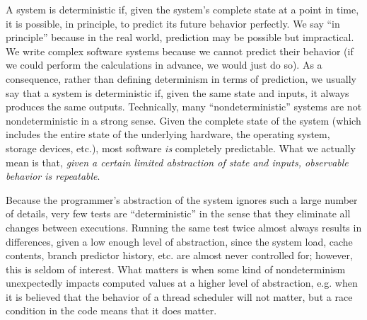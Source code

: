A system is deterministic if, given the system's complete state at a point in
time, it is possible, in principle, to predict its future behavior
perfectly.  We say ``in principle'' because in the real world,
prediction may be possible but  impractical.  We write
complex software systems because we cannot predict their
behavior (if we could perform the calculations in advance, 
we would just do so).  As a consequence, rather than
defining determinism in terms of prediction, we usually 
say that a system is deterministic if, given the same state and
inputs, it always produces the same outputs.  
Technically, many ``nondeterministic'' systems are not
nondeterministic in a strong sense.  Given the complete state
of the system (which includes the entire state of the underlying
hardware, the operating system, storage devices, etc.),
most software \emph{is} completely predictable.  What we actually
mean is that, \emph{given a certain limited abstraction of state
and inputs, observable behavior is repeatable}.  %

Because the
programmer's abstraction of the system ignores  such a large number of
details, very few tests are ``deterministic'' in the sense
that they eliminate all changes between executions.  Running the same test
twice almost always results in differences, given a low enough level of
abstraction, since the system load,
cache contents, branch predictor history, etc. are almost never
controlled for; however, this is seldom of interest.  What matters is when
some kind of nondeterminism unexpectedly impacts computed values at a
higher level of abstraction, e.g. when it is believed that the
behavior of a thread scheduler will not matter, but a race condition
in the code means that it does matter.

\begin{comment} in general, if the operating system
itself is not buggy, low-level nondeterminism, by design, is invisible
except in fine-grained performance testing or real-time systems.
Unexpected nondeterminism usually arises when there is an element of higher-level
state or input that \emph{is} critical to the produced behavior, but
the programmer has not anticipated.  E.g.,  when it is believed that the
behavior of a thread scheduler will not matter, but a race condition
in the code means that it does matter, or when the order of items in
an iterator on a hash table is important, and the hash values used are
randomly salted.
\end{comment}

